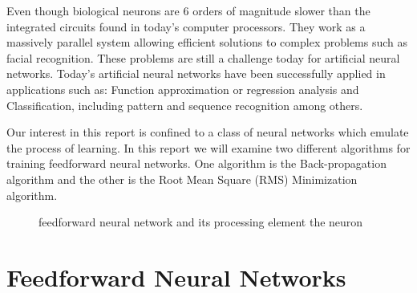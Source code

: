 \documentclass[11pt]{article}
\begin{document}
Even though biological neurons are 6 orders of magnitude slower than the integrated circuits found in today's computer processors. They
work as a massively parallel system allowing efficient solutions to complex problems such as facial recognition. These problems are
still a challenge today for artificial neural networks. Today's artificial neural networks have been successfully applied in
applications such as: Function approximation or regression analysis and Classification, including pattern and sequence recognition among
others.

Our interest in this report is confined to a class of neural networks which emulate the process of learning. In this report we will
examine two different algorithms for training feedforward neural networks. One algorithm is the Back-propagation algorithm and the other
is the Root Mean Square (RMS) Minimization algorithm.

\begin{figure}[]
	\centering
		\caption{feedforward neural network and its processing element the neuron}
	\label{fig:figures_ffwdnn_Neuron}	
\end{figure}

\section{Feedforward Neural Networks} %
\label{sec:feedforward_neural_networks}
\end{document}
